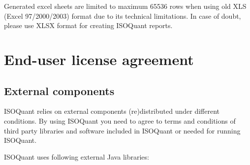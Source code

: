 \documentclass[]{article}
\begin{document}
Generated excel sheets are limited to maximum 65536 rows when using old
XLS (Excel 97/2000/2003) format due to its technical limitations. In
case of doubt, please use XLSX format for creating ISOQuant reports.

\clearpage

\section{End-user license agreement}\label{end-user-license-agreement}

\subsection{External components}\label{external-components}

ISOQuant relies on external components (re)distributed under different
conditions. By using ISOQuant you need to agree to terms and conditions
of third party libraries and software included in ISOQuant or needed for
running ISOQuant.

ISOQuant uses following external Java libraries:
\end{document}
